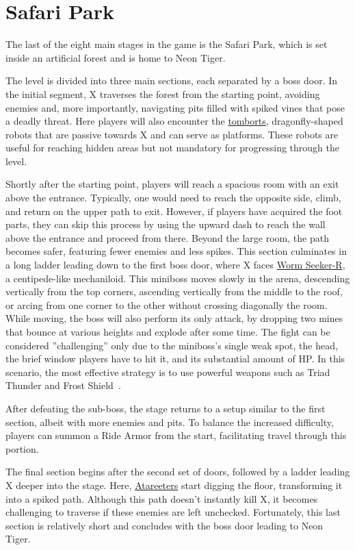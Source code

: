 \section{Safari Park}
The last of the eight main stages in the game is the Safari Park, which is set inside an artificial forest and is home to Neon Tiger.

The level is divided into three main sections, each separated by a boss door. In the initial segment, X traverses the forest from the starting point, avoiding enemies and, more importantly, navigating pits filled with spiked vines that pose a deadly threat. Here players will also encounter the \hyperlink{enem:Tombort}{tomborts}, dragonfly-shaped robots that are passive towards X and can serve as platforms. These robots are useful for reaching hidden areas but not mandatory for progressing through the level.

Shortly after the starting point, players will reach a spacious room with an exit above the entrance. Typically, one would need to reach the opposite side, climb, and return on the upper path to exit. However, if players have acquired the foot parts, they can skip this process by using the upward dash to reach the wall above the entrance and proceed from there. Beyond the large room, the path becomes safer, featuring fewer enemies and less spikes. This section culminates in a long ladder leading down to the first boss door, where X faces \hyperlink{miniboss:Worm_seeker-r}{Worm Seeker-R}, a centipede-like mechaniloid. This miniboss moves slowly in the arena, descending vertically from the top corners, ascending vertically from the middle to the roof, or arcing from one corner to the other without crossing diagonally the room. While moving, the boss will also perform its only attack, by dropping two mines that bounce at various heights and explode after some time. The fight can be considered ''challenging'' only due to the miniboss's single weak spot, the head, the brief window players have to hit it, and its substantial amount of HP. In this scenario, the most effective strategy is to use powerful weapons such as Triad Thunder and Frost Shield~\cite{wiki:Worm_seeker}.

After defeating the sub-boss, the stage returns to a setup similar to the first section, albeit with more enemies and pits. To balance the increased difficulty, players can summon a Ride Armor from the start, facilitating travel through this portion.

The final section begins after the second set of doors, followed by a ladder leading X deeper into the stage. Here, \hyperlink{enem:Atareeter}{Atareeters} start digging the floor, transforming it into a spiked path. Although this path doesn't instantly kill X, it becomes challenging to traverse if these enemies are left unchecked. Fortunately, this last section is relatively short and concludes with the boss door leading to Neon Tiger.

